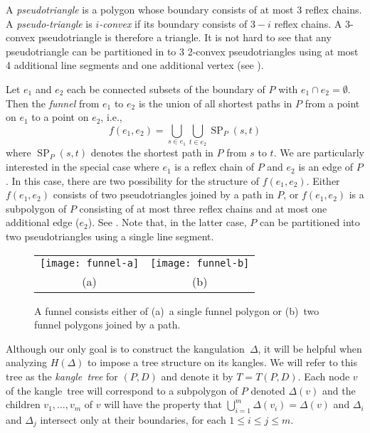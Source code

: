\documentclass[charterfonts,lotsofwhite]{patmorin}
\DeclareMathOperator{\spp}{SP}
\newcommand{\kangle}{kangle}
\newcommand{\kangles}{kangles}
\newcommand{\kangulation}{kangulation}
\begin{document}
A \emph{pseudotriangle} is a polygon whose boundary consists of at
most 3 reflex chains.  A \emph{pseudo-triangle} is \emph{$i$-convex} if its
boundary consists of $3-i$ reflex chains.  A 3-convex pseudotriangle
is therefore a triangle.   It is not hard to see that any
pseudotriangle can be partitioned in to 3 2-convex pseudotriangles
using at most 4 additional line segments and one additional vertex
(see ).

Let $e_1$ and $e_2$ each be connected
subsets of the boundary of $P$ with $e_1\cap e_2=\emptyset$.  Then the
\emph{funnel} from $e_1$ to $e_2$ is the union of all shortest paths
in $P$ from a point on $e_1$ to a point on $e_2$, i.e.,
\[
   f(e_1,e_2) = \bigcup_{s\in e_1}\bigcup_{t\in e_2} \spp_P(s,t)
\]
where $\spp_P(s,t)$ denotes the shortest path in $P$ from $s$ to $t$.
We are particularly interested in the special case where $e_1$ is a
reflex chain of $P$ and $e_2$ is an edge of $P$.  In this case, there
are two possibility for the structure of $f(e_1,e_2)$.  Either
$f(e_1,e_2)$ consists of two pseudotriangles joined by a path in $P$,
or $f(e_1,e_2)$ is a subpolygon of $P$ consisting of at most three reflex
chains and at most one additional edge ($e_2$).  See .
Note that, in the latter case, $P$ can be partitioned into two
pseudotriangles using a single line segment.

\begin{figure}
  \begin{center}
    \begin{tabular}{cc}
      \texttt{[image: funnel-a]} &  \texttt{[image: funnel-b]} \\
      (a) & (b)
    \end{tabular}
  \end{center}
  \caption{A funnel consists either of (a)~a single funnel polygon or
           (b)~two funnel polygons joined by a path.}
\end{figure}

Although our only goal is to construct the \kangulation\ $\Delta$, it
will be helpful when analyzing $H(\Delta)$ to impose a tree structure
on its \kangles.  We will refer to this tree as the \emph{\kangle\
tree} for $(P,D)$ and denote it by $T=T(P,D)$.  Each node $v$ of the
\kangle\ tree will correspond to a subpolygon of $P$ denoted
$\Delta(v)$ and the children $v_1,\ldots,v_m$ of $v$ will have the
property that $\bigcup_{i=1}^m \Delta(v_i)=\Delta(v)$ and $\Delta_i$
and $\Delta_j$ intersect only at their boundaries, for each $1\le i\le
j\le m$.
\end{document}
